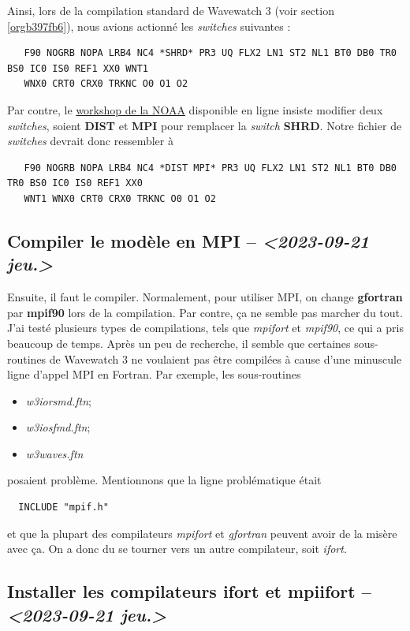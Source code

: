 \documentclass[10pt]{article}
\numberwithin{equation}{section}
\begin{document}
Ainsi, lors de la compilation standard de Wavewatch 3 (voir section \ref{orgb397fb6}), nous avions actionné les \emph{switches} suivantes : 
\begin{verbatim}
   F90 NOGRB NOPA LRB4 NC4 *SHRD* PR3 UQ FLX2 LN1 ST2 NL1 BT0 DB0 TR0 BS0 IC0 IS0 REF1 XX0 WNT1
   WNX0 CRT0 CRX0 TRKNC O0 O1 O2
\end{verbatim}

Par contre, le \href{https://polar.ncep.noaa.gov/waves/workshop/pdfs/WW3-workshop-exercises-day4-MPI.pdf}{workshop de la NOAA} disponible en ligne insiste modifier deux \emph{switches}, soient \textbf{DIST} et \textbf{MPI} pour remplacer la \emph{switch} \textbf{SHRD}.
Notre fichier de \emph{switches} devrait donc ressembler à
\begin{verbatim}
   F90 NOGRB NOPA LRB4 NC4 *DIST MPI* PR3 UQ FLX2 LN1 ST2 NL1 BT0 DB0 TR0 BS0 IC0 IS0 REF1 XX0
   WNT1 WNX0 CRT0 CRX0 TRKNC O0 O1 O2
\end{verbatim}

\subsection{Compiler le modèle en MPI -- \textit{<2023-09-21 jeu.>}}
\label{sec:org72cabba}
Ensuite, il faut le compiler.
Normalement, pour utiliser MPI, on change \textbf{gfortran} par \textbf{mpif90} lors de la compilation.
Par contre, ça ne semble pas marcher du tout.
J'ai testé plusieurs types de compilations, tels que \emph{mpifort} et \emph{mpif90}, ce qui a pris beaucoup de temps.
Après un peu de recherche, il semble que certaines sous-routines de Wavewatch 3 ne voulaient pas être compilées à cause d'une minuscule ligne d'appel MPI en Fortran.
Par exemple, les sous-routines
\begin{itemize}
\item \emph{w3iorsmd.ftn};
\item \emph{w3iosfmd.ftn};
\item \emph{w3waves.ftn}
\end{itemize}
posaient problème.
Mentionnons que la ligne problématique était
\begin{verbatim}
  INCLUDE "mpif.h"
\end{verbatim}
et que la plupart des compilateurs \emph{mpifort} et \emph{gfortran} peuvent avoir de la misère avec ça.
On a donc du se tourner vers un autre compilateur, soit \emph{ifort}. 


\subsection{Installer les compilateurs ifort et mpiifort -- \textit{<2023-09-21 jeu.>}}
\label{sec:org6b71238}
\end{document}
